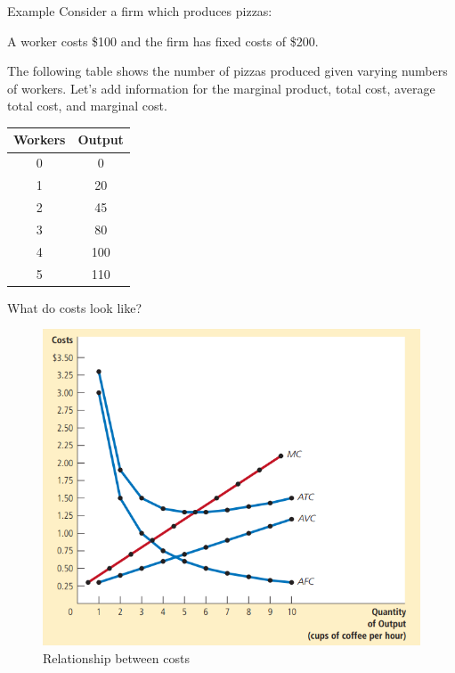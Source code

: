 \documentclass[compress]{beamer}
\begin{document}
\begin{frame}{Example}
    Consider a firm which produces pizzas:
    
    \vspace{3mm}
    
     A worker costs \$100 and the firm has fixed costs of \$200. 
     
     \vspace{3mm}
     
         The following table shows the number of pizzas produced given varying numbers of workers. Let's add information for the marginal product, total cost, average total cost, and marginal cost.
    \begin{table}[H]
        \centering
        \begin{tabular}{cc}
            Workers & Output \\
            \hline
            0 & 0 \\
            1 & 20 \\
            2 & 45 \\
            3 & 80 \\
            4 & 100 \\
            5 & 110 \\
        \end{tabular}

        \label{tab:placeholder}
    \end{table}
\end{frame}

\begin{frame}{What do costs look like?}
\begin{figure}
        \centering
        \includegraphics[width=0.65\linewidth]{uTC.png}
        \caption{Relationship between costs}
        \label{fig:placeholder}
    \end{figure}
\end{frame}
\end{document}
